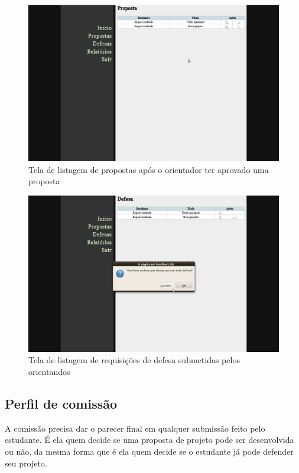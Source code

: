 \begin{figure}[htbp]
\centering
\includegraphics[width=1\textwidth]{fig/telas/processo/professor_03_proposta_aprovada.png}
\caption{Tela de listagem de propostas após o orientador ter aprovado uma proposta}
\label{fig:professor_03_proposta_aprovada}
\end{figure}

\begin{figure}[htbp]
\centering
\includegraphics[width=1\textwidth]{fig/telas/processo/professor_04_avaliando_defesa.png}
\caption{Tela de listagem de requisições de defesa submetidas pelos orientandos}
\label{fig:professor_04_avaliando_defesa}
\end{figure}

\subsection{Perfil de comissão}
A comissão precisa dar o parecer final em qualquer submissão feito pelo estudante. É ela quem
decide se uma proposta de projeto pode ser desenvolvida ou não, da mesma forma que é ela quem
decide se o estudante já pode defender seu projeto.

